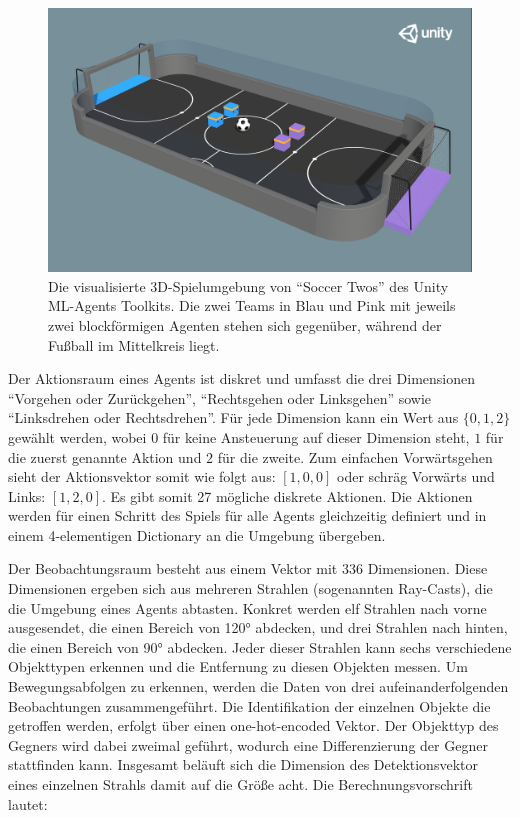 \documentclass[twocolumn]{webofc}
\begin{document}
\begin{figure}
  \centering
  \includegraphics[width=\columnwidth]{img/soccer_twos.png}
  \caption{Die visualisierte 3D-Spielumgebung von \enquote{Soccer Twos} des Unity \ac{ML}-Agents Toolkits. Die zwei Teams in Blau und Pink mit jeweils zwei blockförmigen Agenten stehen sich gegenüber, während der Fußball im Mittelkreis liegt. \cite{juliani2020}}
  \label{fig:eval}
\end{figure}

Der Aktionsraum eines Agents ist diskret und umfasst die drei Dimensionen \enquote{Vorgehen oder Zurückgehen}, \enquote{Rechtsgehen oder Linksgehen} sowie \enquote{Linksdrehen oder Rechtsdrehen}. Für jede Dimension kann ein Wert aus \(\{0,1, 2\}\) gewählt werden, wobei \(0\) für keine Ansteuerung auf dieser Dimension steht, \(1\) für die zuerst genannte Aktion und \(2\) für die zweite. Zum einfachen Vorwärtsgehen sieht der Aktionsvektor somit wie folgt aus: \([1, 0, 0]\) oder schräg Vorwärts und Links: \([1, 2, 0]\). Es gibt somit 27 mögliche diskrete Aktionen.
Die Aktionen werden für einen Schritt des Spiels für alle Agents gleichzeitig definiert und in einem 4-elementigen Dictionary an die Umgebung übergeben.

Der Beobachtungsraum besteht aus einem Vektor mit 336 Dimensionen. Diese Dimensionen ergeben sich aus mehreren Strahlen (sogenannten Ray-Casts), die die Umgebung eines Agents abtasten. Konkret werden elf Strahlen nach vorne ausgesendet, die einen Bereich von 120° abdecken, und drei Strahlen nach hinten, die einen Bereich von 90° abdecken. Jeder dieser Strahlen kann sechs verschiedene Objekttypen erkennen und die Entfernung zu diesen Objekten messen. Um Bewegungsabfolgen zu erkennen, werden die Daten von drei aufeinanderfolgenden Beobachtungen zusammengeführt. Die Identifikation der einzelnen Objekte die getroffen werden, erfolgt über einen one-hot-encoded Vektor. Der Objekttyp des Gegners wird dabei zweimal geführt, wodurch eine Differenzierung der Gegner stattfinden kann. Insgesamt beläuft sich die Dimension des Detektionsvektor eines einzelnen Strahls damit auf die Größe acht. Die Berechnungsvorschrift lautet:
\end{document}
